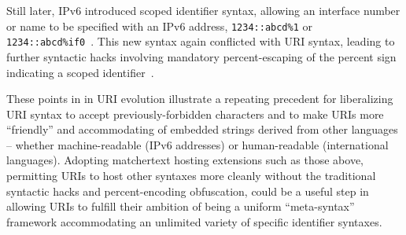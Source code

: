 Still later, IPv6 introduced scoped identifier syntax,
allowing an interface number or name to be specified with an IPv6 address,
\eg \verb|1234::abcd%1| or \verb|1234::abcd%if0|~\cite{rfc4007}.
This new syntax again conflicted with URI syntax,
leading to further syntactic hacks involving
mandatory percent-escaping of the percent sign
indicating a scoped identifier~\cite{rfc6874}.

These points in in URI evolution illustrate
a repeating precedent for liberalizing URI syntax
to accept previously-forbidden characters
and to make URIs more ``friendly'' and accommodating
of embedded strings derived from other languages --
whether machine-readable (\eg IPv6 addresses)
or human-readable (international languages).
Adopting matchertext hosting extensions such as those above,
permitting URIs to host other syntaxes more cleanly
without the traditional  syntactic hacks and percent-encoding obfuscation,
could be a useful step in allowing URIs to fulfill their ambition
of being a uniform ``meta-syntax'' framework
accommodating an unlimited variety of specific identifier syntaxes.


